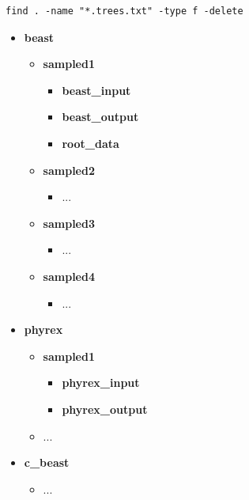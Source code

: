 \begin{verbatim}
find . -name "*.trees.txt" -type f -delete
\end{verbatim} 

\begin{itemize}
\item \textbf{beast}
\begin{itemize}
\item \textbf{sampled1}
\begin{itemize}
\item \textbf{beast\_input}
\item \textbf{beast\_output}
\item \textbf{root\_data}
\end{itemize}
\item \textbf{sampled2}
\begin{itemize}
\item ...
\end{itemize}
\item \textbf{sampled3}
\begin{itemize}
\item ...
\end{itemize}
\item \textbf{sampled4}
\begin{itemize}
\item ...
\end{itemize}
\end{itemize}

\item \textbf{phyrex}
\begin{itemize}
\item \textbf{sampled1}
\begin{itemize}
\item \textbf{phyrex\_input}
\item \textbf{phyrex\_output}
\end{itemize}
\item ...

\end{itemize}

\item \textbf{c\_beast}
\begin{itemize}
\item ...
\end{itemize}





\end{itemize}

\clearpage


